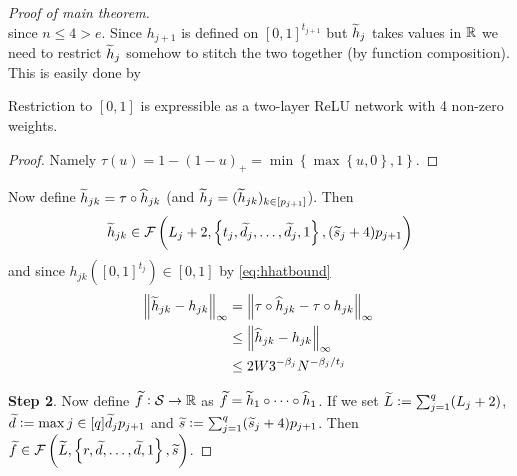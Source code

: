 \begin{proof}[Proof of main theorem]
\begin{equation}
  \end{equation} 
  since $n\leq 4 > e$.
  Since $h_{j+1}$ is defined on $[0, 1]^{t_{j+1}}$ but $\widetilde{h}_j$ takes values
  in $\mathbb{R}$ we need to restrict $\widetilde{h}_j$ somehow to stitch
  the two together (by function composition). This is easily done by
  \begin{lem}
    Restriction to $[0, 1]$ is expressible as a two-layer ReLU network
    with 4 non-zero weights.
  \end{lem}
  \begin{proof}
    Namely $\tau(u) = 1 - (1 - u)_+ = \min \left\{
    \max \left\{ u, 0 \right\}, 1 \right\}$. %
  \end{proof}
  Now define
  $\widetilde{h}_{jk} = \tau \circ \widehat{h}_{jk}$
  (and $\widetilde{h}_{j} = (\widetilde{h}_{jk})_{k \in [p_{j + 1}]}$).
  Then
  \begin{equation}
    \widetilde{h}_{jk} \in \mathcal{F}\left( L_j + 2, \left\{ t_j,
  \widetilde{d}_j, \dots, \widetilde{d}_j, 1 \right\}, (\widetilde{s}_j + 4) p_{j+1} \right)
  \end{equation}
  and since $h_{jk}([0, 1]^{t_j}) \in [0, 1]$ by \cref{eq:hhatbound}
  \begin{align}
    \norm{\widetilde{h}_{jk} - h_{jk}}_\infty
    = &\; \norm{\tau \circ \widehat{h}_{jk} - \tau \circ h_{jk}}_\infty
    \\ \leq &\; \norm{\widehat{h}_{jk} - h_{jk}}_\infty
    \\ \leq &\; 2 W 3^{-\beta_j} N^{-\beta_j/t_j}
  \end{align}

  \textbf{Step 2}.
  Now define $\widetilde{f}:\mathcal{S} \to \mathbb{R}$
  as $\widetilde{f} = \widetilde{h}_1 \circ \dots \circ \widehat{h}_1$.
  If we set
  $\widetilde{L} \vcentcolon= \sum_{j=1}^q (L_j + 2)$,
  $\widetilde{d} \vcentcolon= \max{j \in [q]} \widetilde{d}_j p_{j+1}$
  and $\widetilde{s} \vcentcolon= \sum_{j=1}^q (\widetilde{s}_j + 4) p_{j+1}$.
  Then $\widetilde{f} \in \mathcal{F}\left( \widetilde{L}, \left\{ 
  r, \widetilde{d}, \dots, \widetilde{d}, 1\right\}, \widetilde{s} \right)$.
   	

\end{proof}
